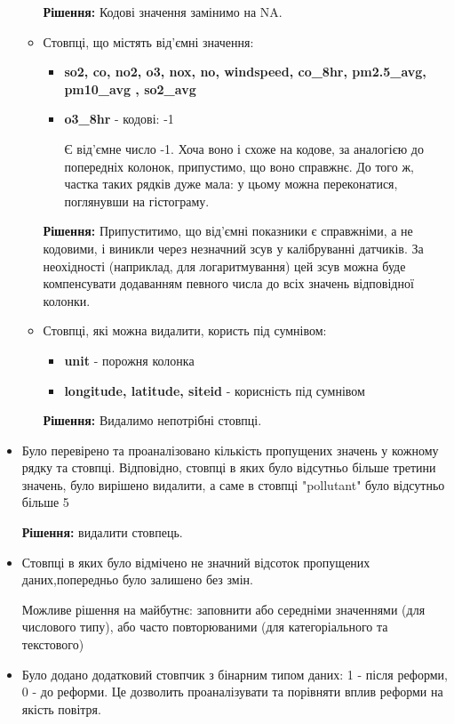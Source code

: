 \documentclass{article}
\begin{document}
\begin{itemize}
\begin{itemize}
            \textbf{ Рішення:} Кодові значення замінимо на NA.

             \item Стовпці, що містять від'ємні значення:
             \begin{itemize}
                \item \textbf{so2, co, no2,  o3, nox, no, windspeed, co\_8hr, pm2.5\_avg, pm10\_avg , so2\_avg} 
                \item \textbf{o3\_8hr} - кодові: -1

                Є від'ємне число -1. Хоча воно і схоже на кодове, за аналогією до попередніх колонок, припустимо, що воно справжнє. До того ж, частка таких рядків дуже мала: у цьому можна переконатися, поглянувши на гістограму.
             \end{itemize}

             \textbf{Рішення:} Припуститимо, що від'ємні показники є справжніми, а не кодовими, і виникли через незначний зсув у калібруванні датчиків. За неохідності (наприклад, для логаритмування) цей зсув можна буде компенсувати додаванням певного числа до всіх значень відповідної колонки.
             
             \item Стовпці, які можна видалити, користь під сумнівом:
             \begin{itemize}
                 \item \textbf{unit} - порожня колонка
                 \item \textbf{longitude, latitude, siteid}  - корисність під сумнівом
             \end{itemize}
             
             \textbf{Рішення:} Видалимо непотрібні стовпці.
         \end{itemize}
    
    \item Було перевірено та проаналізовано кількість пропущених значень у кожному рядку та стовпці. Відповідно, стовпці в яких було відсутньо більше третини значень, було вирішено видалити, а саме в стовпці "pollutant" було відсутньо більше 5%
    
    \textbf{Рішення:} видалити стовпець.
    
    \item Стовпці в яких було відмічено не значний відсоток пропущених даних,попередньо було залишено без змін. 
    
    Можливе рішення на майбутнє: заповнити або середніми значеннями (для числового типу), або часто повторюваними (для категоріального та текстового) 
    
    \item Було додано додатковий стовпчик з бінарним типом даних: 1 - після реформи, 0 - до реформи. Це дозволить проаналізувати та порівняти вплив реформи на якість повітря.
\end{itemize}
\end{document}
